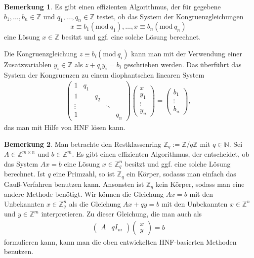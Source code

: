 \documentclass[
a4paper,12pt,
bibliography=totocnumbered,
numbers=noenddot,
]{scrartcl}
\numberwithin{equation}{subsection}
\newcommand{\N}{\mathbb N}
\newcommand{\Z}{\mathbb Z}
\theoremstyle{plain}
\theoremstyle{definition}
\newtheorem*{bem}{Bemerkung}
\begin{document}
\begin{bem}
	Es gibt einen effizienten Algorithmus, der für gegebene $b_1,\ldots,b_n \in \Z$ und $q_1,\ldots,q_n \in \Z$ testet, ob das System der Kongruenzgleichungen 
	\[	
		x \equiv b_1 (\mathrm{mod} \ q_1), \ldots, x \equiv b_n (\mathrm{mod} \ q_n)
	\]
	eine Lösung $x \in \Z$ besitzt und ggf. eine solche Lösung berechnet. 

	Die Kongruenzgleichung $z \equiv b_i (\mathrm{mod} \ q_i)$ kann man mit der Verwendung einer Zusatzvariablen $y_i \in \Z$ als $z + q_i y_i = b_i$ geschrieben werden. Das überführt das System der Kongruenzen zu einem diophantschen linearen System 
	\begin{align*}
			\begin{pmatrix} 1 & q_1 &  &
			\\ 1 & & q_2 & 
			\\ \vdots & & & \ddots 
			\\ 1 & & & & q_n 
			\end{pmatrix} 
			\begin{pmatrix} x \\ y_1 \\ \vdots \\ y_n \end{pmatrix} 
			= 
			\begin{pmatrix} b_1 \\ \vdots \\ b_n \end{pmatrix},  
	\end{align*}
	das man mit Hilfe von HNF lösen kann. 
\end{bem} 

\begin{bem}
	Man betrachte den Restklassenring $ \Z_q  := \Z/ q \Z$ mit $q \in \N$. Sei $A \in \Z^{m \times n}$ und $b \in \Z^m$. Es gibt einen effizienten Algorithmus, der entscheidet, ob das System $A x = b$ eine Lösung $x \in \Z_q^n$ besitzt und ggf. eine solche Lösung berechnet. Ist $q$ eine Primzahl, so ist $\Z_q$ ein Körper, sodasss man einfach das Gauß-Verfahren benutzen kann. Ansonsten ist $\Z_q$ kein Körper, sodass man eine andere Methode benötigt. Wir können die Gleichung $A x = b$ mit den Unbekannten $x \in \Z_q^n$ als die Gleichung $A x + q y = b$ mit den Unbekannten $x \in \Z^n$ und $y \in \Z^m$ interpretieren. Zu dieser Gleichung, die man auch als
	\begin{align*}
			\begin{pmatrix} A & q I_m \end{pmatrix} \begin{pmatrix} x \\ y  \end{pmatrix}  = b
	\end{align*}
	formulieren kann, kann man die oben entwickelten HNF-basierten Methoden benutzen. 
\end{bem} 
\end{document}
